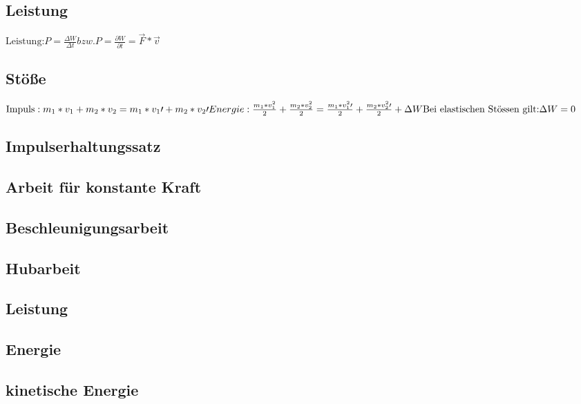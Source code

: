 \documentclass[10pt,a4paper]{article}
\begin{document}
	\subsection{Leistung}
	\begin{mdframed}[style=exercise]
		\begin{math}
			\text{Leistung:} P = \frac{\Delta W}{\Delta t} bzw. P = \frac{\partial W}{\partial t} = \vec F * \vec v
		\end{math}
	\end{mdframed}

	\subsection{Stöße}
	\begin{mdframed}[style=exercise]
		\begin{math}
			\text{Impuls}: m_{1}*v_{1} + m_{2}*v_{2} = m_{1}*v_{1}\prime + m_{2}*v_{2}\prime
			\newline
			Energie: \frac{m_{1} * v_{1}^2}{2} + \frac{m_{2} * v_{2}^2}{2} = \frac{m_{1} * v_{1}^2\prime}{2} + \frac{m_{2} * v_{2}^2\prime}{2} + \Delta W
			\newline
			\text{Bei elastischen Stössen gilt:} \Delta W = 0
		\end{math}
	\end{mdframed}

	\subsection{Impulserhaltungssatz}
	\subsection{Arbeit für konstante Kraft}
	\subsection{Beschleunigungsarbeit}
	\subsection{Hubarbeit}
	\subsection{Leistung}
	\subsection{Energie}
	\subsection{kinetische Energie}
\end{document}
